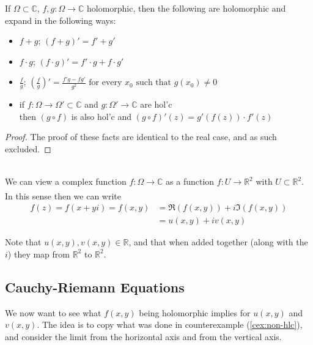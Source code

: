\begin{lemma}
If $\Omega \subset \mathbb{C}$, $f,g:\Omega \xrightarrow{} \mathbb{C}$ holomorphic, then the following are holomorphic and expand in the following ways:
\begin{itemize}
    \item $f+g$; $(f+g)' = f'+g'$
    \item $f \cdot g$; $(f \cdot g)' = f' \cdot g +f \cdot g'$\\
    \item $\frac{f}{g}$; $\left( \frac{f}{g} \right)' = \frac{f'g-fg'}{g^2} \text{ for every $x_0$ such that $g(x_0) \neq 0$ }$\\
    \item if $f:\Omega\xrightarrow{}\Omega' \subset \mathbb{C}$ and $g:\Omega'\xrightarrow{}\mathbb{C}$ are hol'c\\ then $(g \circ f)$ is also hol'c and $(g \circ f)'(z) = g'(f(z))\cdot f'(z)$
\end{itemize}
\end{lemma}

\begin{proof}
The proof of these facts are identical to the real case, and as such excluded.
\end{proof}\\



We can view a complex function $f:\Omega \xrightarrow[]{} \mathbb{C}$ as a function $f:U \xrightarrow{} \mathbb{R}^2$ with $U \subset \mathbb{R}^2$. In this sense then we can write
\begin{align*}
f(z)=f(x+yi)=f(x,y) &= \Re (f(x,y)) + i \Im (f(x,y))\\ &= u(x,y)+iv(x,y)
\end{align*}

Note that $u(x,y),v(x,y) \in \mathbb{R}$, and that when added together (along with the $i$) they map from $\mathbb{R}^2$ to $\mathbb{R}^2$.

\subsection{Cauchy-Riemann Equations}

We now want to see what $f(x,y)$ being holomorphic implies for $u(x,y)$ and $v(x,y)$. The idea is to copy what was done in counterexample (\ref{cex:non-hlc}), and consider the limit from the horizontal axis and from the vertical axis.\\

